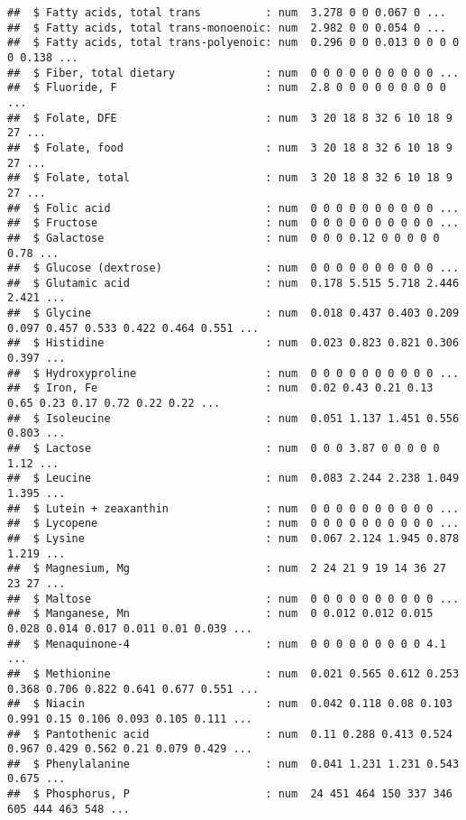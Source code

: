 \documentclass[]{article}
\begin{document}
\begin{verbatim}
##  $ Fatty acids, total trans          : num  3.278 0 0 0.067 0 ...
##  $ Fatty acids, total trans-monoenoic: num  2.982 0 0 0.054 0 ...
##  $ Fatty acids, total trans-polyenoic: num  0.296 0 0 0.013 0 0 0 0 0 0.138 ...
##  $ Fiber, total dietary              : num  0 0 0 0 0 0 0 0 0 0 ...
##  $ Fluoride, F                       : num  2.8 0 0 0 0 0 0 0 0 0 ...
##  $ Folate, DFE                       : num  3 20 18 8 32 6 10 18 9 27 ...
##  $ Folate, food                      : num  3 20 18 8 32 6 10 18 9 27 ...
##  $ Folate, total                     : num  3 20 18 8 32 6 10 18 9 27 ...
##  $ Folic acid                        : num  0 0 0 0 0 0 0 0 0 0 ...
##  $ Fructose                          : num  0 0 0 0 0 0 0 0 0 0 ...
##  $ Galactose                         : num  0 0 0 0.12 0 0 0 0 0 0.78 ...
##  $ Glucose (dextrose)                : num  0 0 0 0 0 0 0 0 0 0 ...
##  $ Glutamic acid                     : num  0.178 5.515 5.718 2.446 2.421 ...
##  $ Glycine                           : num  0.018 0.437 0.403 0.209 0.097 0.457 0.533 0.422 0.464 0.551 ...
##  $ Histidine                         : num  0.023 0.823 0.821 0.306 0.397 ...
##  $ Hydroxyproline                    : num  0 0 0 0 0 0 0 0 0 0 ...
##  $ Iron, Fe                          : num  0.02 0.43 0.21 0.13 0.65 0.23 0.17 0.72 0.22 0.22 ...
##  $ Isoleucine                        : num  0.051 1.137 1.451 0.556 0.803 ...
##  $ Lactose                           : num  0 0 0 3.87 0 0 0 0 0 1.12 ...
##  $ Leucine                           : num  0.083 2.244 2.238 1.049 1.395 ...
##  $ Lutein + zeaxanthin               : num  0 0 0 0 0 0 0 0 0 0 ...
##  $ Lycopene                          : num  0 0 0 0 0 0 0 0 0 0 ...
##  $ Lysine                            : num  0.067 2.124 1.945 0.878 1.219 ...
##  $ Magnesium, Mg                     : num  2 24 21 9 19 14 36 27 23 27 ...
##  $ Maltose                           : num  0 0 0 0 0 0 0 0 0 0 ...
##  $ Manganese, Mn                     : num  0 0.012 0.012 0.015 0.028 0.014 0.017 0.011 0.01 0.039 ...
##  $ Menaquinone-4                     : num  0 0 0 0 0 0 0 0 0 4.1 ...
##  $ Methionine                        : num  0.021 0.565 0.612 0.253 0.368 0.706 0.822 0.641 0.677 0.551 ...
##  $ Niacin                            : num  0.042 0.118 0.08 0.103 0.991 0.15 0.106 0.093 0.105 0.111 ...
##  $ Pantothenic acid                  : num  0.11 0.288 0.413 0.524 0.967 0.429 0.562 0.21 0.079 0.429 ...
##  $ Phenylalanine                     : num  0.041 1.231 1.231 0.543 0.675 ...
##  $ Phosphorus, P                     : num  24 451 464 150 337 346 605 444 463 548 ...

\end{verbatim}
\end{document}
